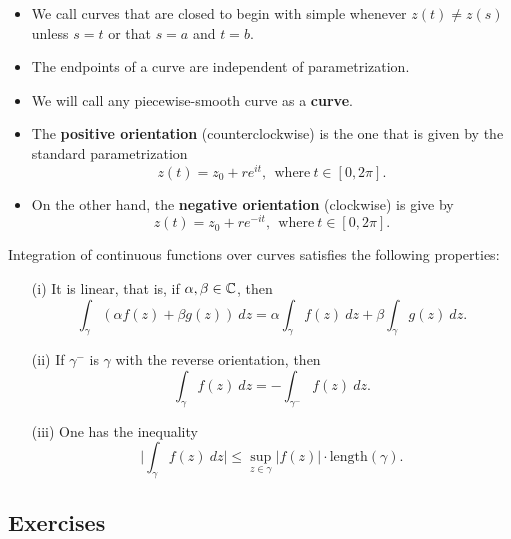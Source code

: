 \documentclass[11pt,a4paper]{book}
\begin{document}
\begin{itemize}
\item We call curves that are closed to begin with simple whenever \( z(t) \neq z(s) \) unless \( s = t  \) or that \( s = a  \) and \( t = b  \).
\item The endpoints of a curve are independent of parametrization.
\item We will call any piecewise-smooth curve as a \textbf{curve}.
\end{itemize}

\begin{definition}[Orientation]
    \begin{itemize}
        \item The \textbf{positive orientation} (counterclockwise) is the one that is given by the standard parametrization  
            \[  z(t) = {z}_{0} + r e^{i t}, \ \ \text{where} \  t \in [0,2\pi]. \]
        \item On the other hand, the \textbf{negative orientation} (clockwise) is give by
    \[  z(t) = {z}_{0} + r e^{-i t}, \ \ \text{where} \   t \in [0,2\pi]. \]
    \end{itemize}
\end{definition}

\begin{prop}
   Integration of continuous functions over curves satisfies the following properties: 
   \begin{enumerate}
       \item[(i)] It is linear, that is, if \( \alpha, \beta \in \mathbb{C}  \), then
           \[  \int_{ \gamma }^{  }  (\alpha f(z) + \beta g(z)) \ dz = \alpha \int_{ \gamma }^{  } f(z) \ dz + \beta \int_{ \gamma }^{  }  g(z) \ dz. \]
       \item[(ii)] If \( \gamma^{-} \) is \( \gamma \) with the reverse orientation, then
           \[  \int_{ \gamma }^{  } f(z) \ dz = - \int_{ \gamma^{-} }^{  }  f(z) \ dz. \]
        \item[(iii)] One has the inequality
            \[  \Big| \int_{ \gamma }^{  } f(z) \ dz \Big| \leq \sup_{z \in \gamma} | f(z) | \cdot \text{length}(\gamma).   \]
   \end{enumerate}
\end{prop}

\subsection{Exercises}
\end{document}
